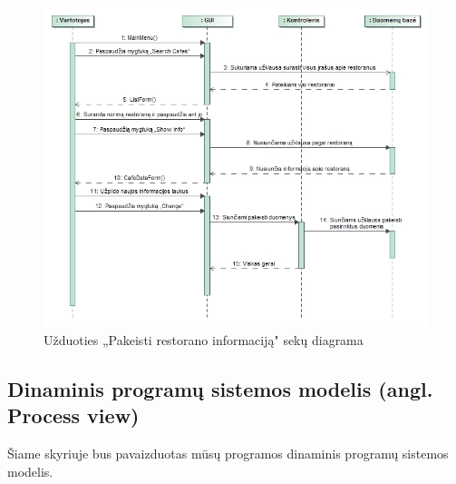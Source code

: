 \documentclass{VUMIFPSkursinis}
\begin{document}
\begin{figure}[H]
	\centering
	\includegraphics[width=\textwidth,height=\textheight,keepaspectratio]{img/ChangeInfo}
	\caption{Užduoties „Pakeisti restorano informaciją" sekų diagrama}
	\label{img:ChangeInfo}
\end{figure}

\subsection{Dinaminis programų sistemos modelis (angl. Process view)}
Šiame skyriuje bus pavaizduotas mūsų programos dinaminis programų sistemos modelis.
\end{document}
